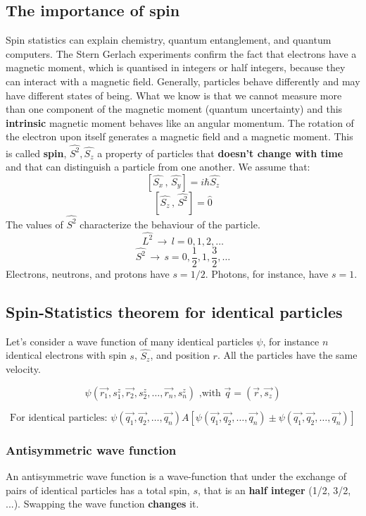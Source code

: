 	\subsection{The importance of spin}
	Spin statistics can explain chemistry, quantum entanglement, and quantum computers.
	The Stern Gerlach experiments confirm the fact that electrons have a magnetic moment, which is quantised in integers or half integers, because they can interact with a magnetic field.
Generally, particles behave differently and may have different states of being.
	What we know is that we cannot measure more than one component of the magnetic moment (quantum uncertainty) and this \textbf{intrinsic} magnetic moment behaves like an angular momentum.
	The rotation of the electron upon itself generates a magnetic field and a magnetic moment.
This is called \textbf{spin}, $\hat{S^2},\hat{S_z}$ a property of particles that \textbf{doesn't change with time} and that can distinguish a particle from one another.
	\newline
	We assume that:
	\[ [\hat{S_x}\,,\,\hat{S_y}]=i\hbar\hat{S_z} \]
	\[ [\hat{S_z}\,,\,\hat{S^2}]=\hat{0} \]
	The values of $\hat{S^2}$ characterize the behaviour of the particle.
	$$\hat{L^2}\,\rightarrow\,l=0, 1, 2, \dots$$
	$$\hat{S^2}\,\rightarrow\,s=0, \frac{1}{2}, 1, \frac{3}{2}, \dots$$
	Electrons, neutrons, and protons have $s=1/2$.
Photons, for instance, have $s=1$.

	\subsection{Spin-Statistics theorem for identical particles}
	Let's consider a wave function of many identical particles $\psi$, for instance $n$ identical electrons with spin $s$, $\hat{S_z}$, and position $r$.
All the particles have the same velocity.

	$$\psi(\vec{r_1}, s_1^z, \vec{r_2}, s_2^z, \dots, \vec{r_n}, s_n^z) \text{ ,with } \vec{q}=(\vec{r},\vec{s_z})$$

	$$\text{For identical particles: }\psi(\vec{q_1},\vec{q_2}, \dots, \vec{q_n})A[\psi(\vec{q_1},\vec{q_2}, \dots, \vec{q_n})\pm\psi(\vec{q_1},\vec{q_2}, \dots, \vec{q_n})]$$

		\subsubsection{Antisymmetric wave function}
		An antisymmetric wave function is a wave-function that under the exchange of pairs of identical particles has a total spin, $s$, that is an \textbf{half integer} (1/2, 3/2, ...).
		Swapping the wave function \textbf{changes} it.

